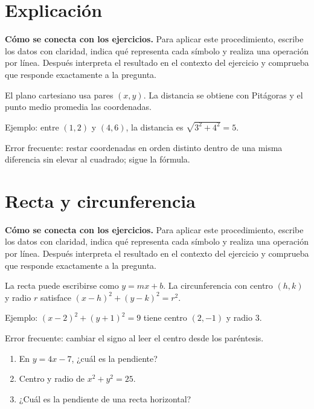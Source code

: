 \documentclass[10pt,oneside,openany]{book}
\begin{document}
\section{Explicación}

\textbf{Cómo se conecta con los ejercicios.} Para aplicar este procedimiento, escribe los datos con claridad, indica qué representa cada símbolo y realiza una operación por línea. Después interpreta el resultado en el contexto del ejercicio y comprueba que responde exactamente a la pregunta.

El plano cartesiano usa pares $(x,y)$. La distancia se obtiene con Pitágoras y el punto medio promedia las coordenadas.



\begin{ejemplo}
Ejemplo: entre $(1,2)$ y $(4,6)$, la distancia es $\sqrt{3^2+4^2}=5$.
\end{ejemplo}

\begin{ojo}
Error frecuente: restar coordenadas en orden distinto dentro de una misma diferencia sin elevar al cuadrado; sigue la fórmula.
\end{ojo}



\section{Recta y circunferencia}

\textbf{Cómo se conecta con los ejercicios.} Para aplicar este procedimiento, escribe los datos con claridad, indica qué representa cada símbolo y realiza una operación por línea. Después interpreta el resultado en el contexto del ejercicio y comprueba que responde exactamente a la pregunta.

La recta puede escribirse como $y=mx+b$. La circunferencia con centro $(h,k)$ y radio $r$ satisface $(x-h)^2+(y-k)^2=r^2$.

\begin{ejemplo}
Ejemplo: $(x-2)^2+(y+1)^2=9$ tiene centro $(2,-1)$ y radio 3.
\end{ejemplo}

\begin{ojo}
Error frecuente: cambiar el signo al leer el centro desde los paréntesis.
\end{ojo}

\begin{practica}

\begin{enumerate}

\item En $y=4x-7$, ¿cuál es la pendiente?

\item Centro y radio de $x^2+y^2=25$.

\item ¿Cuál es la pendiente de una recta horizontal?

\end{enumerate}

\end{practica}
\end{document}

